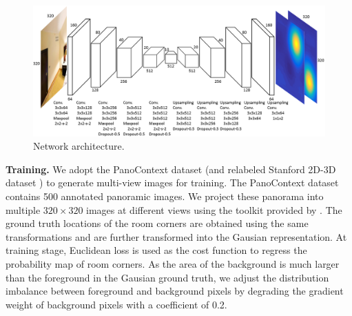 \begin{figure}
	\centering
	\includegraphics[width=\linewidth]{figs/network.png}
	\caption{Network architecture. }
	\label{fig:network}
\end{figure}

\noindent\textbf{Training.} 
We adopt the PanoContext dataset \cite{zhang2014panocontext} (and relabeled Stanford 2D-3D dataset \cite{layoutnet}) to generate multi-view images for training. The PanoContext dataset contains 500 annotated panoramic images. We project these panorama into multiple $320 \times 320$ images at different views using the toolkit provided by \cite{zhang2014panocontext}. The ground truth locations of the room corners are obtained using the same transformations and are further transformed into the Gausian representation. At training stage, Euclidean loss is used as the cost function to regress the probability map of room corners. As the area of the background is much larger than the foreground in the Gausian ground truth, we adjust the distribution imbalance between foreground and background pixels by degrading the gradient weight of background pixels with a coefficient of 0.2.



